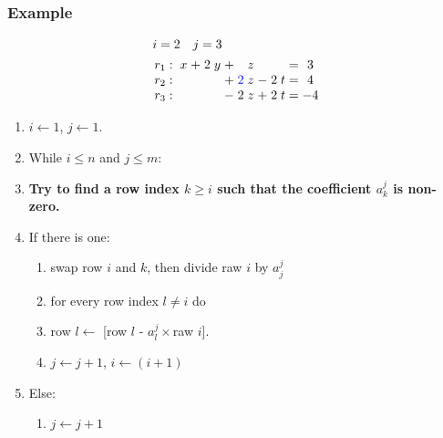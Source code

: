 \documentclass{beamer}
\begin{document}
\begin{frame}
  \frametitle{Example}
  
  \[\arraycolsep=1.4pt
  \begin{aligned}
    &i = 2 \quad j = 3\\
      &
    \begin{array}{lcccccccccccccc}
        r_1  & : &  & x & + & 2 & y & + &  & z &  & & & = & 3\\
        r_2 & : &   &   &  &   &  & + & {\color{blue}2} & z & - & 2 & t  & = & 4\\
        r_3  & : &  &   &  &   &   & - & 2 & z & + & 2 & t & = & -4\\
    \end{array}
  \end{aligned}
  \]
  
  
  \begin{enumerate}
  \item $i \leftarrow 1$, $j \leftarrow 1$.
  \item While $i \le n$ and $j \le m$:
  \item {\bf Try to find a row index $k \ge i$ such that the coefficient $a^j_k$ is non-zero.}
  \item If there is one:
    \begin{enumerate}
    \item swap row $i$ and $k$, then divide raw $i$ by $a^{j}_j$
    \item for every row index $l \neq i$ do 
    \item row $l \leftarrow$ [row $l$ - $a^j_l\times$raw $i$].
    \item $j \leftarrow j+1$, $i \leftarrow (i+1)$
    \end{enumerate}
  \item Else:
    \begin{enumerate}
    \item $j \leftarrow j+1$
    \end{enumerate}
  \end{enumerate}
  
\end{frame}
\end{document}
